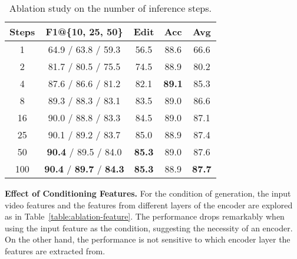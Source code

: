 \documentclass[10pt,twocolumn,letterpaper]{article}
\begin{document}
\begin{table}[t]
\begin{center}
\footnotesize
\begin{tabular}{c | c c c c c c}
\hline
 Steps & \multicolumn{3}{c}{F1@\{10, 25, 50\}} & Edit & Acc & Avg\\
\hline
1 & \multicolumn{3}{c}{ 64.9 / 63.8 / 59.3 } & 56.5 & 88.6 & 66.6 \\
2 & \multicolumn{3}{c}{ 81.7 / 80.5 / 75.5 } & 74.5 & 88.9 & 80.2 \\
4 & \multicolumn{3}{c}{ 87.6 / 86.6 / 81.2 } & 82.1 & \textbf{89.1} & 85.3 \\
8 & \multicolumn{3}{c}{ 89.3 / 88.3 / 83.1 } & 83.5 & 89.0 & 86.6 \\
16 & \multicolumn{3}{c}{ 90.0 / 88.8 / 83.3 } & 84.5 & 89.0 & 87.1 \\
25 & \multicolumn{3}{c}{ 90.1 / 89.2 / 83.7 } & 85.0 & 88.9 & 87.4 \\
50 & \multicolumn{3}{c}{ \textbf{90.4} / 89.5 / 84.0 } & \textbf{85.3} & 89.0 & 87.6 \\
100 & \multicolumn{3}{c}{ \textbf{90.4} / \textbf{89.7} / \textbf{84.3} } & \textbf{85.3} & 88.9 & \textbf{87.7} \\
\hline
\end{tabular}
\end{center}
\caption{Ablation study on the number of inference steps.} 
\label{table:ablation-steps}
\end{table}

\textbf{Effect of Conditioning Features.}
For the condition of generation, the input video features  and the features from different layers of the encoder  are explored as in Table~\ref{table:ablation-feature}.
The performance drops remarkably when using the input feature  as the condition, suggesting the necessity of an encoder.
On the other hand, the performance is not sensitive to which encoder layer the features are extracted from.
\end{document}
